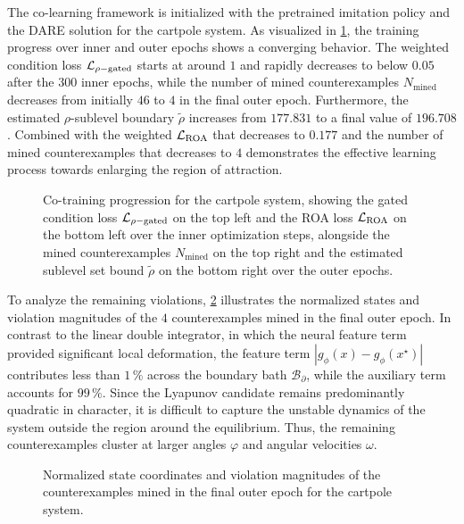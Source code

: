 The co-learning framework is initialized with the pretrained imitation policy and the DARE solution for the cartpole system. 
As visualized in \cref{fig:cp-cotraining-traces}, the training progress over inner and outer epochs shows a converging behavior. 
The weighted condition loss $\mathcal{L}_{\rho\mathrm{-gated}}$ starts at around $1$ and rapidly decreases to below $0.05$ 
after the $300$ inner epochs, while the number of mined counterexamples $N_{\mathrm{mined}}$ decreases from initially $46$ to $4$ in the final 
outer epoch. Furthermore, the estimated $\rho$-sublevel boundary $\tilde{\rho}$ increases from $177.831$ to a final value of $196.708$. 
Combined with the weighted $\mathcal{L}_{\mathrm{ROA}}$ that decreases to $0.177$ and the number of mined counterexamples that decreases 
to $4$ demonstrates the effective learning process towards enlarging the region of attraction. 
\begin{figure}[htbp]
    \centering
    
    \caption[Cartpole co-training convergence traces]{
        Co-training progression for the cartpole system, showing the gated condition loss $\mathcal{L}_{\rho\mathrm{-gated}}$ on the top left 
        and the ROA loss $\mathcal{L}_{\mathrm{ROA}}$ on the bottom left over the inner optimization steps, alongside 
        the mined counterexamples $N_{\mathrm{mined}}$ on the top right and the estimated sublevel set bound $\tilde{\rho}$ on the bottom right 
        over the outer epochs.}
    \label{fig:cp-cotraining-traces}
\end{figure}

To analyze the remaining violations, \cref{fig:cp-final-counterexamples} illustrates the normalized states and violation 
magnitudes of the $4$ counterexamples mined in the final outer epoch. 
In contrast to the linear double integrator, in which the neural feature term provided significant local deformation, 
the feature term $|g_\phi(x) - g_\phi(x^\star)|$ contributes less than $1\,\%$ across the boundary bath $\mathcal{B}_\partial$, 
while the auxiliary term accounts for $99\,\%$.
Since the Lyapunov candidate remains predominantly quadratic in character, it is difficult to capture the unstable dynamics 
of the system outside the region around the equilibrium. Thus, the remaining counterexamples cluster at larger 
angles $\varphi$ and angular velocities $\omega$.
\begin{figure}[htbp]
    \centering
    
    \caption{Normalized state coordinates and violation magnitudes of the counterexamples mined in the final outer epoch for the cartpole system.}
    \label{fig:cp-final-counterexamples}
\end{figure}

